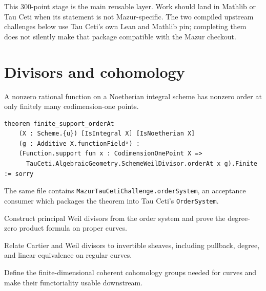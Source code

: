 This 300-point stage is the main reusable layer.  Work should land in Mathlib
or Tau Ceti when its statement is not Mazur-specific.  The two compiled
upstream challenges below use Tau Ceti's own Lean and Mathlib pin; completing
them does not silently make that package compatible with the Mazur checkout.

\section{Divisors and cohomology}

\begin{theorem}\label{node:MT-TC-A1-ORDER-SUPPORT}
A nonzero rational function on a Noetherian integral scheme has
nonzero order at only finitely many codimension-one points.
\leanpending
\end{theorem}

\begin{verbatim}
theorem finite_support_orderAt
    (X : Scheme.{u}) [IsIntegral X] [IsNoetherian X]
    (g : Additive X.functionFieldˣ) :
    (Function.support fun x : CodimensionOnePoint X =>
      TauCeti.AlgebraicGeometry.SchemeWeilDivisor.orderAt x g).Finite := sorry
\end{verbatim}

The same file contains \texttt{MazurTauCetiChallenge.orderSystem}, an
acceptance consumer which packages the theorem into Tau Ceti's
\texttt{OrderSystem}.

\begin{theorem}\label{node:MT-TC-A2-PRODUCT-FORMULA}
Construct principal Weil divisors from the order system and prove the
degree-zero product formula on proper curves.
\leanpending
\end{theorem}

\begin{milestone}\label{node:MT-TC-A3-DIVISOR-LINE-BUNDLE}
Relate Cartier and Weil divisors to invertible sheaves, including pullback,
degree, and linear equivalence on regular curves.
\leanpending
\end{milestone}

\begin{milestone}\label{node:MT-TC-B1-COHERENT-COHOMOLOGY}
Define the finite-dimensional coherent cohomology groups needed for curves
and make their functoriality usable downstream.
\leanpending
\end{milestone}

